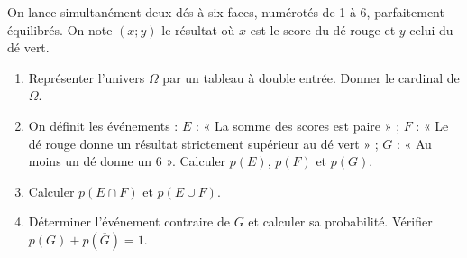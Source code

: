 \documentclass[11pt]{article}
\begin{document}
\begin{exercice}
On lance simultanément deux dés à six faces, numérotés de \num{1} à \num{6}, parfaitement équilibrés. On note $(x; y)$ le résultat où $x$ est le score du dé rouge et $y$ celui du dé vert.
\begin{enumerate}
    \item Représenter l'univers $\Omega$ par un tableau à double entrée. Donner le cardinal de $\Omega$.
    \item On définit les événements : $E$ : « La somme des scores est paire » ; $F$ : « Le dé rouge donne un résultat strictement supérieur au dé vert » ; $G$ : « Au moins un dé donne un $6$ ».
    Calculer $p(E)$, $p(F)$ et $p(G)$.
    \item Calculer $p(E \cap F)$ et $p(E \cup F)$.
    \item Déterminer l'événement contraire de $G$ et calculer sa probabilité. Vérifier $p(G) + p(\overline{G}) = 1$.
\end{enumerate}
\end{exercice}
\end{document}
